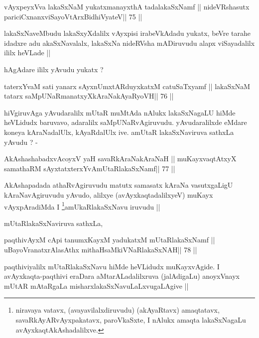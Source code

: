 \begin{shl}
vAyxpeyxVva lakaSxNaM yukatxmanayxthA tadalakaSxNamf ||
nideVRshasutx pariciCxnanxviSayoV\s tArxBidhiVyateV\hfill || 75 ||
\end{shl}

\begin{artha}
lakaSxNaveMbudu lakaSxyXdalilx vAyxpisi irabeVkAdadu yukatx, beVre
tarahe idadxre adu akaSxNavalalx, lakaSxNa nideRVsha mADiruvudu alapx
viSayadalilx ililx heVLade ||

hAgAdare ililx yAvudu yukatx ?
\end{artha}

\begin{shl}
taterxYvaM sati yanarx sAyxnUmxtARduyxkatxM catuSaTxyamf ||
lakaSxNaM tatarx saMpUNaRmanatxyXkAraNakAyaRyoVH\hfill || 76 ||
\end{shl}

\begin{artha}
hiVgiruvAga yAvudaralilx mUtaR muMtAda nAlukx lakaSxNagaLU hiMde
heVLidudx baruvavo, adaralilx saMpUNaRvAgiruvudu. yAvudaralilxde
eMdare koneya kAraNadalUlx, kAyaRdalUlx ive. amUtaR lakaSxNaviruva
sathxLa yAvudu ? -
\end{artha}

\begin{shl}
AkAshashabadxvAcoyxV yaH savaRkAraNakAraNaH ||
muKayxvaqtAtxyX samathaRM sAyxtatxterxYvAmUtaRlakaSxNamf\hfill || 77 ||
\end{shl}

\begin{artha}
AkAshapadada athaRvAgiruvudu matutx samasatx kAraNa vasutxgaLigU
kAraNavAgiruvudu yAvudo, alilxye (avAyxkaqtadalilxyeV) muKayx
vAyxpAradiMda I \footnote[1]{niravaya vatavx, (avayavilalxdiruvudu)
  (akAyaRtavx) amaqtatavx, savaRkAyARvAyxpakatavx, paroVkaSxte, I
  nAlukx amaqta lakaSxNagaLu avAyxkaqtAkAshadalilxve.}amUkaRlakaSxNavu iruvudu ||

mUtaRlakaSxNaviruva sathxLa,
\end{artha}

\begin{shl}
paqthivAyxM cApi tanumxKayxM yadukatxM \footnotemark[2]mUtaRlakaSxNamf ||
uBayoVranatxrAlasAthx mithaHsaMkiVNaRlakaSxNAH\hfill || 78 ||
\end{shl}

\begin{artha}
paqthiviyalilx mUtaRlakaSxNavu hiMde heVLidudx muKayxvAgide. I
avAyxkaqta-paqthivi eraDara aMtarALadalilxruva (jalAdigaLu) anoyxVnayx
mUtAR mAtaRgaLa misharxlakaSxNavuLaLxvugaLAgive ||
\end{artha}

